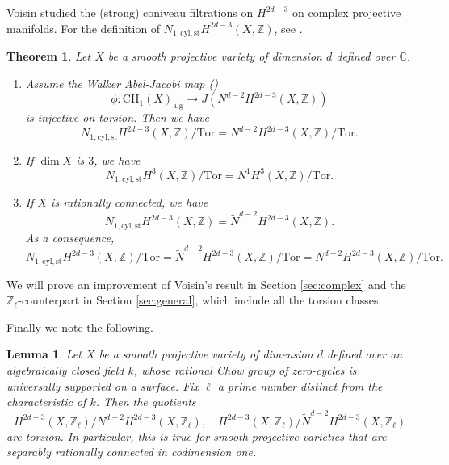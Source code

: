 \documentclass{amsart}
\newtheorem{thm}[theorem]{Theorem}
\newtheorem{lem}[theorem]{Lemma}
\theoremstyle{definition}
\theoremstyle{remark}
\newcommand{\mbb}{\mathbb}
\newcommand{\ZZ}{\mbb{Z}}
\newcommand{\CC}{\mbb{C}}
\newcommand{\cyl}{\text{cyl}}
\newcommand{\st}{\text{st}}
\begin{document}
Voisin studied the (strong) coniveau filtrations on $H^{2d-3}$ \cite{VoisinConiveau} on complex projective manifolds.
For the definition of $N_{1, \cyl, \st}H^{2d-3}(X, \ZZ)$, see \cite[Definition 1.12]{VoisinConiveau}.
\begin{thm}\cite[Theorem 2.6, Corollary 2.7, Theorem 2.17]{VoisinConiveau}
Let $X$ be a smooth projective variety of dimension $d$ defined over $\CC$.
\begin{enumerate}
    \item Assume the Walker Abel-Jacobi map (\cite{Walker_Morphic_AJ})
    \[
    \phi: \text{CH}_1(X)_{\text{alg}} \to J(N^{d-2}H^{2d-3}(X, \ZZ))
    \]is injective on torsion. Then we have
    \[
    N_{1, \cyl, \st}H^{2d-3}(X, \ZZ)/\text{Tor} = N^{d-2}H^{2d-3}(X, \ZZ)/\text{Tor}.
    \]
    \item If $\dim X$ is $3$, we have
    \[
    N_{1, \cyl, \st}H^{3}(X, \ZZ)/\text{Tor} = N^1H^{3}(X, \ZZ)/\text{Tor}.
    \] 
    \item If $X$ is rationally connected, we have
    \[
    N_{1, \cyl, \st}H^{2d-3}(X, \ZZ) = \tilde{N}^{d-2}H^{2d-3}(X, \ZZ).
    \]
    As a consequence,
    \[
    N_{1, \cyl, \st}H^{2d-3}(X, \ZZ)/\text{Tor}=\tilde{N}^{d-2}H^{2d-3}(X, \ZZ)/\text{Tor} = N^{d-2}H^{2d-3}(X, \ZZ)/\text{Tor}.
    \]
\end{enumerate}
\end{thm}

We will prove an improvement of Voisin's result in Section \ref{sec:complex} and the $\ZZ_\ell$-counterpart in Section \ref{sec:general}, which include all the torsion classes.

Finally we note the following.
\begin{lem}\label{cor:2d-3torsion}
     Let $X$ be a smooth projective variety of dimension $d$ defined over an algebraically closed field $k$, whose rational Chow group of  zero-cycles is universally supported on a surface. 
     Fix $\ell$ a prime number distinct from the characteristic of $k$.
     Then the quotients $$H^{2d-3}(X, \ZZ_\ell)/N^{d-2}H^{2d-3}(X, \ZZ_\ell),\quad H^{2d-3}(X, \ZZ_\ell)/\tilde{N}^{d-2}H^{2d-3}(X, \ZZ_\ell)$$ are torsion.   
     In particular, this is true for smooth projective varieties that are separably rationally connected in codimension one.
\end{lem}
\end{document}
